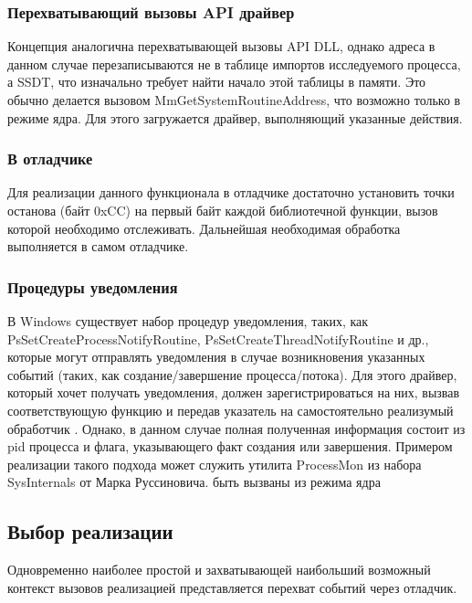\subsubsection {Перехватывающий вызовы API драйвер}
 Концепция аналогична перехватывающей вызовы API DLL, однако адреса в данном случае перезаписываются не в
 таблице импортов исследуемого процесса, а SSDT, что изначально требует найти начало этой таблицы в памяти. Это обычно делается вызовом MmGetSystemRoutineAddress, что возможно только в режиме ядра. Для этого загружается драйвер, выполняющий указанные действия.
\subsubsection {В отладчике}
Для реализации данного функционала в отладчике достаточно установить точки останова (байт 0xCC) на первый байт каждой библиотечной функции, вызов которой необходимо отслеживать. Дальнейшая необходимая обработка выполняется в самом отладчике.
\subsubsection {Процедуры уведомления}
В Windows существует набор процедур уведомления, таких, как\\
PsSetCreateProcessNotifyRoutine, PsSetCreateThreadNotifyRoutine и др., которые могут отправлять уведомления в случае возникновения указанных событий (таких, как создание/завершение процесса/потока). Для этого драйвер, который хочет получать уведомления, должен зарегистрироваться на них, вызвав соответствующую функцию и передав указатель на самостоятельно реализумый обработчик . Однако, в данном случае полная полученная информация состоит из pid процесса и флага, указывающего факт создания или завершения. Примером реализации такого подхода может служить утилита ProcessMon из набора SysInternals от Марка Руссиновича.
быть вызваны из режима ядра
\subsection {Выбор реализации}
Одновременно наиболее простой и захватывающей наибольший возможный контекст вызовов реализацией представляется перехват событий через отладчик.

